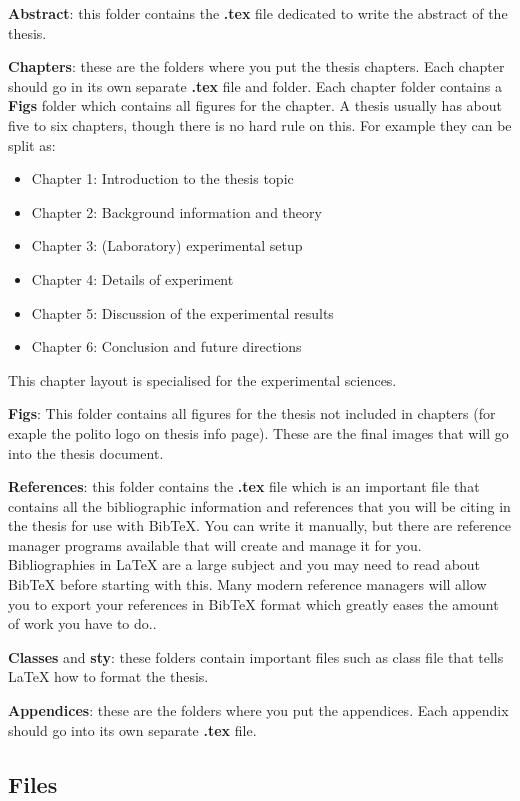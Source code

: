 \textbf{Abstract}: this folder contains the \textbf{.tex} file dedicated to write the abstract of the thesis.

\textbf{Chapters}: these are the folders where you put the thesis chapters.  Each chapter should go in its own separate \textbf{.tex} file and folder. Each chapter folder contains a \textbf{Figs} folder which contains all figures for the chapter. A thesis usually has about five to six chapters, though there is no hard rule on this. For example they can be split as:
\begin{itemize}
	\item Chapter 1: Introduction to the thesis topic
	\item Chapter 2: Background information and theory
	\item Chapter 3: (Laboratory) experimental setup
	\item Chapter 4: Details of experiment
	\item Chapter 5: Discussion of the experimental results
	\item Chapter 6: Conclusion and future directions
\end{itemize}
This chapter layout is specialised for the experimental sciences.

\textbf{Figs}: This folder contains all figures for the thesis not included in chapters (for exaple the polito logo on thesis info page). These are the final images that will go into the thesis document.

\textbf{References}: this folder contains the \textbf{.tex} file which is an important file that contains all the bibliographic information and references that you will be citing in the thesis for use with BibTeX. You can write it manually, but there are reference manager programs available that will create and manage it for you. Bibliographies in \LaTeX{} are a large subject and you may need to read about BibTeX before starting with this. Many modern reference managers will allow you to export your references in BibTeX format which greatly eases the amount of work you have to do..

\textbf{Classes} and \textbf{sty}: these folders contain important files such as class file that tells \LaTeX{} how to format the thesis.

\textbf{Appendices}: these are the folders where you put the appendices. Each appendix should go into its own separate \textbf{.tex} file.

\subsection{Files}


